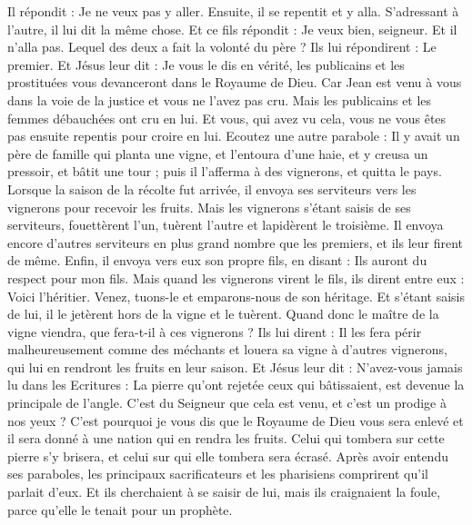 \begin{multicols}{2}
Il répondit : Je ne veux pas y aller. Ensuite, il se repentit et y alla.
S'adressant à l'autre, il lui dit la même chose. Et ce fils répondit : Je veux bien, seigneur. Et il n'alla pas.
Lequel des deux a fait la volonté du père ? Ils lui répondirent : Le premier. Et Jésus leur dit : Je vous le dis en vérité, les publicains et les prostituées vous devanceront dans le Royaume de Dieu.
Car Jean est venu à vous dans la voie de la justice et vous ne l'avez pas cru. Mais les publicains et les femmes débauchées ont cru en lui. Et vous, qui avez vu cela, vous ne vous êtes pas ensuite repentis pour croire en lui.
Ecoutez une autre parabole : Il y avait un père de famille qui planta une vigne, et l'entoura d'une haie, et y creusa un pressoir, et bâtit une tour ; puis il l'afferma à des vignerons, et quitta le pays.
Lorsque la saison de la récolte fut arrivée, il envoya ses serviteurs vers les vignerons pour recevoir les fruits.
Mais les vignerons s'étant saisis de ses serviteurs, fouettèrent l'un, tuèrent l'autre et lapidèrent le troisième.
Il envoya encore d'autres serviteurs en plus grand nombre que les premiers, et ils leur firent de même.
Enfin, il envoya vers eux son propre fils, en disant : Ils auront du respect pour mon fils.
Mais quand les vignerons virent le fils, ils dirent entre eux : Voici l'héritier. Venez, tuons-le et emparons-nous de son héritage.
Et s'étant saisis de lui, il le jetèrent hors de la vigne et le tuèrent.
Quand donc le maître de la vigne viendra, que fera-t-il à ces vignerons ?
Ils lui dirent : Il les fera périr malheureusement comme des méchants et louera sa vigne à d'autres vignerons, qui lui en rendront les fruits en leur saison.
Et Jésus leur dit : N'avez-vous jamais lu dans les Ecritures : La pierre qu'ont rejetée ceux qui bâtissaient, est devenue la principale de l'angle. C'est du Seigneur que cela est venu, et c'est un prodige à nos yeux ?
C'est pourquoi je vous dis que le Royaume de Dieu vous sera enlevé et il sera donné à une nation qui en rendra les fruits.
Celui qui tombera sur cette pierre s'y brisera, et celui sur qui elle tombera sera écrasé.
Après avoir entendu ses paraboles, les principaux sacrificateurs et les pharisiens comprirent qu'il parlait d'eux.
Et ils cherchaient à se saisir de lui, mais ils craignaient la foule, parce qu'elle le tenait pour un prophète.

\end{multicols}
